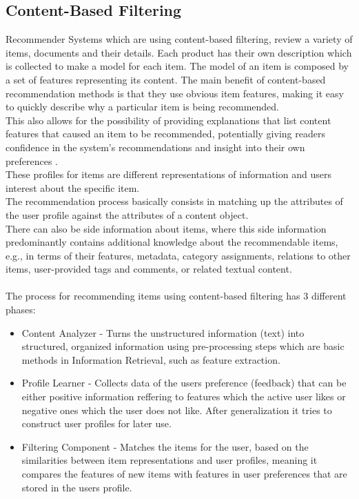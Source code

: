 \documentclass[10pt,oneside,english,a4paper]{article}
\begin{document}
\subsection{Content-Based Filtering}
Recommender Systems which are using content-based filtering, review a variety of items, documents and their details. Each product has their own description which is collected to make a model for each item. The model of an item is composed by a set of features representing its content. The main benefit of content-based recommendation methods is that they use obvious item features, making it easy to quickly describe why a particular item is being recommended. \cite{pub.1034486657}\\
This also allows for the possibility of providing explanations that list content features that caused an item to be recommended, potentially giving readers confidence in the system’s recommendations and insight into their own preferences \cite{Mooney2000195}. \\
These profiles for items are different representations of information and users interest about the specific item. \\
The recommendation process basically consists in matching up the attributes of the user profile against the attributes of a content object. \cite{pub.1034486657}\\
%
%
There can also be side information about items, where this side information predominantly contains additional knowledge about the recommendable items, e.g., in terms of their features, metadata, category assignments, relations to other items, user-provided tags and comments, or related textual content. \cite{Lops2019239}\\\\
The process for recommending items using content-based filtering has 3 different phases:
\begin{itemize}
\item Content Analyzer - Turns the unstructured information (text) into structured, organized information using pre-processing steps which are basic methods in Information Retrieval, such as feature extraction.
\item Profile Learner - Collects data of the users preference (feedback) that can be either positive information reffering to features which the active user likes or negative ones which the user does not like. After generalization it tries to construct user profiles for later use.
\item Filtering Component - Matches the items for the user, based on the similarities between item representations and user profiles, meaning it compares the features of new items with features in user preferences that are stored in the users profile. \cite{DeGemmis2015119}
\end{itemize}
\end{document}

